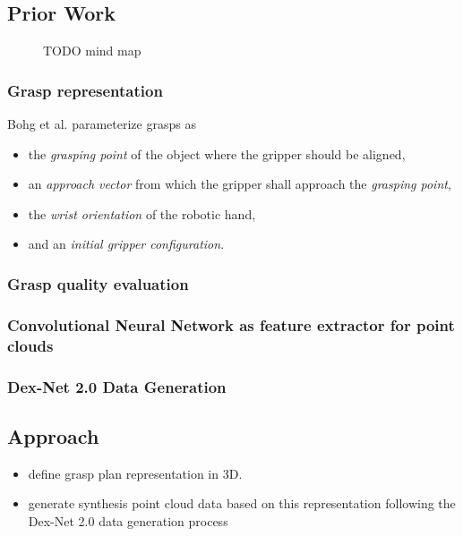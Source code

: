 \documentclass[12pt]{article}
\begin{document}
    \subsection{Prior Work}
    \begin{figure}[h!]
        \centering
        \caption{TODO mind map}
        \label{fig:mindmap}
    \end{figure}

	\subsubsection{Grasp representation}
	Bohg et al. \cite{Bohg2014} parameterize grasps as
	\begin{itemize}
		\item the \emph{grasping point} of the object where the gripper should be aligned,
		\item an \emph{approach vector} from which the gripper shall approach the \emph{grasping point},
		\item the \emph{wrist orientation} of the robotic hand,
		\item and an \emph{initial gripper configuration}.
	\end{itemize}

    \subsubsection{Grasp quality evaluation}

    \subsubsection{Convolutional Neural Network as feature extractor for point clouds}

    \subsubsection{Dex-Net 2.0 Data Generation}

    \subsection{Approach}
	\begin{itemize}
		\item define grasp plan representation in 3D.
		\item generate synthesis point cloud data based on this representation following the Dex-Net 2.0 data generation process \cite{mahler2017}
	\end{itemize}
\end{document}
